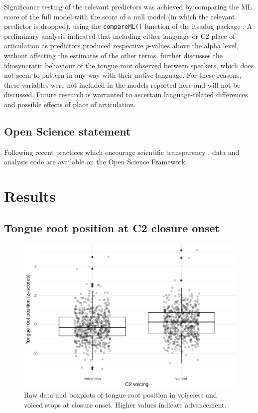 \documentclass[12pt,]{article}
\begin{document}
Significance testing of the relevant predictors was achieved by
comparing the ML score of the full model with the score of a null model
(in which the relevant predictor is dropped), using the
\texttt{compareML()} function of the itsadug package
\citep{van-rij2017}. A preliminary analysis indicated that including
either language or C2 place of articulation as predictors produced
respective \emph{p}-values above the alpha level, without affecting the
estimates of the other terms.  further discusses the
idiosyncratic behaviour of the tongue root observed between speakers,
which does not seem to pattern in any way with their native language.
For these reasons, these variables were not included in the models
reported here and will not be discussed. Future research is warranted to
ascertain language-related differences and possible effects of place of
articulation.

\hypertarget{open-science-statement}{%
\subsection{Open Science statement}\label{open-science-statement}}

Following recent practices which encourage scientific transparency
\citep{cruwell2018, berez-kroeker2018, roettger2019}, data and analysis
code are available on the Open Science Framework.

\hypertarget{results}{%
\section{Results}\label{results}}

\label{s:results}

\hypertarget{tongue-root-position-at-c2-closure-onset}{%
\subsection{Tongue root position at C2 closure
onset}\label{tongue-root-position-at-c2-closure-onset}}

\begin{figure}
\includegraphics[width=\linewidth]{2018-tra_files/figure-latex/trp-z-box-1} \caption{Raw data and boxplots of tongue root position in voiceless and voiced stops at closure onset. Higher values indicate advancement.}\label{f:trp-z-box}
\end{figure}
\end{document}
